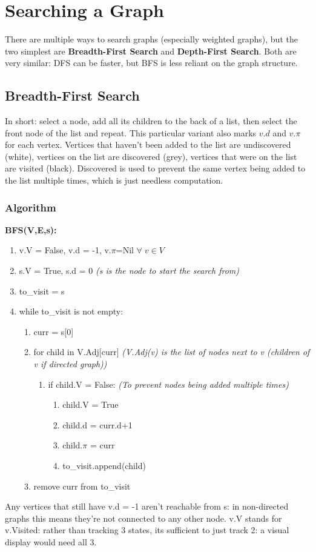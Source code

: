 \section{Searching a Graph}
There are multiple ways to search graphs (especially weighted graphs), but the two simplest are \textbf{Breadth-First Search} and \textbf{Depth-First Search}. Both are very similar: DFS can be faster, but BFS is less reliant on the graph structure. 

\subsection{Breadth-First Search}
In short: select a node, add all its children to the back of a list, then select the front node of the list and repeat. This particular variant also marks $v.d $ and $v.\pi$ for each vertex. Vertices that haven't been added to the list are undiscovered (white), vertices on the list are discovered (grey), vertices that were on the list are visited (black). Discovered is used to prevent the same vertex being added to the list multiple times, which is just needless computation.

\subsubsection{Algorithm}
\textbf{BFS(V,E,s):}
\begin{enumerate}[label=\Alph*]
\item v.V = False, v.d = -1, v.$\pi$=Nil $\forall \; v\in V$
\item s.V = True, s.d = 0 \emph{(s is the node to start the search from)}
\item to\_visit = {s}
\item while to\_visit is not empty:
\begin{enumerate}[label=\arabic*]
    \item curr = s[0]
    \item for child in V.Adj[curr] \emph{(V.Adj(v) is the list of nodes next to v (children of v if directed graph))}
    \begin{enumerate}
        \item if child.V = False: \emph{(To prevent nodes being added multiple times)}
        \begin{enumerate}
            \item child.V = True
            \item child.d = curr.d+1
            \item child.$\pi$ = curr
            \item to\_visit.append(child)
        \end{enumerate}
    \end{enumerate}
    \item remove curr from to\_visit
\end{enumerate}
\end{enumerate}
Any vertices that still have v.d = -1 aren't reachable from s: in non-directed graphs this means they're not connected to any other node. v.V stands for v.Visited: rather than tracking 3 states, its sufficient to just track 2: a visual display would need all 3. 

